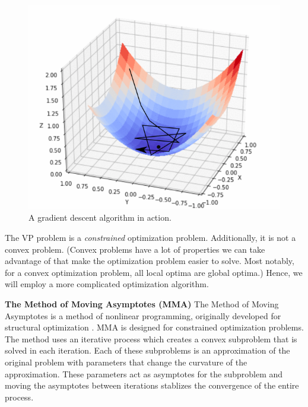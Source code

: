 \documentclass[final]{beamer}
\begin{document}
\begin{frame}
	\begin{figure}
		\centering
		\includegraphics[height=0.75\textheight]{fastlr.png}
		\caption{A gradient descent algorithm in action. \cite{kathuria_2020}}
	\end{figure}
\end{frame}

\begin{frame}{}
	The VP problem is a {\color{tiananmen}\textit{constrained}} optimization problem.\vfill\pause
	Additionally, it is {\color{tiananmen}not} a convex problem.\vfill\pause
	(Convex problems have a lot of properties we can take advantage of that make the optimization problem easier to solve. Most notably, {\color{baystate}for a convex optimization problem, all local optima are global optima}.)\vfill\pause
	Hence, we will employ a more complicated optimization algorithm.\vfill
\end{frame}

\begin{frame}[t]{\textbf{The Method of Moving Asymptotes (MMA)}}
	 The Method of Moving Asymptotes is a method of nonlinear programming, originally developed for structural optimization \cite{Svanberg1987}. {\color{tiananmen}MMA is designed for constrained optimization problems.}
	 \vfill\pause
	 The method uses an iterative process which creates a {\color{baystate}convex subproblem} that is solved in each iteration. Each of these subproblems is an approximation of the original problem with parameters that change the curvature of the approximation.
	 \vfill\pause
	 These parameters act as asymptotes for the subproblem and moving the asymptotes between iterations stablizes the convergence of the entire process.
\end{frame}
\end{document}
